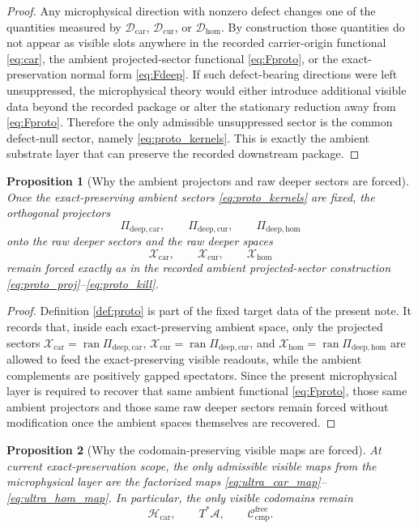 \documentclass[11pt]{article}
\newcommand{\Sub}{\mathcal A}
\newcommand{\CompFree}{\mathscr C_{\mathrm{cmp}}^{\mathrm{free}}}
\newcommand{\CarrierClass}{\mathscr H_{\mathrm{car}}}
\newcommand{\DeepTensorClass}{\mathscr X_{\mathrm{car}}}
\newcommand{\DeepRelabelClass}{\mathscr X_{\mathrm{cur}}}
\newcommand{\DeepFreeClass}{\mathscr X_{\mathrm{hom}}}
\newcommand{\ProtoCarProj}{\Pi_{\mathrm{deep,car}}}
\newcommand{\ProtoCurProj}{\Pi_{\mathrm{deep,cur}}}
\newcommand{\ProtoHomProj}{\Pi_{\mathrm{deep,hom}}}
\newcommand{\TensorDefect}{\mathcal D_{\mathrm{car}}}
\newcommand{\CurDefect}{\mathcal D_{\mathrm{cur}}}
\newcommand{\HomDefect}{\mathcal D_{\mathrm{hom}}}
\newtheorem{proposition}{Proposition}
\begin{document}
\begin{proof}
Any microphysical direction with nonzero defect changes one of the quantities measured by \(\TensorDefect\), \(\CurDefect\), or \(\HomDefect\). By construction those quantities do not appear as visible slots anywhere in the recorded carrier-origin functional \eqref{eq:car}, the ambient projected-sector functional \eqref{eq:Fproto}, or the exact-preservation normal form \eqref{eq:Fdeep}. If such defect-bearing directions were left unsuppressed, the microphysical theory would either introduce additional visible data beyond the recorded package or alter the stationary reduction away from \eqref{eq:Fproto}. Therefore the only admissible unsuppressed sector is the common defect-null sector, namely \eqref{eq:proto_kernels}. This is exactly the ambient substrate layer that can preserve the recorded downstream package.
\end{proof}

\begin{proposition}[Why the ambient projectors and raw deeper sectors are forced]
\label{prop:ambient_raw}
Once the exact-preserving ambient sectors \eqref{eq:proto_kernels} are fixed, the orthogonal projectors
\[
\ProtoCarProj,\qquad
\ProtoCurProj,\qquad
\ProtoHomProj
\]
onto the raw deeper sectors and the raw deeper spaces
\[
\DeepTensorClass,\qquad
\DeepRelabelClass,\qquad
\DeepFreeClass
\]
remain forced exactly as in the recorded ambient projected-sector construction \eqref{eq:proto_proj}--\eqref{eq:proto_kill}.
\end{proposition}

\begin{proof}
Definition \ref{def:proto} is part of the fixed target data of the present note. It records that, inside each exact-preserving ambient space, only the projected sectors \(\DeepTensorClass=\operatorname{ran}\ProtoCarProj\), \(\DeepRelabelClass=\operatorname{ran}\ProtoCurProj\), and \(\DeepFreeClass=\operatorname{ran}\ProtoHomProj\) are allowed to feed the exact-preserving visible readouts, while the ambient complements are positively gapped spectators. Since the present microphysical layer is required to recover that same ambient functional \eqref{eq:Fproto}, those same ambient projectors and those same raw deeper sectors remain forced without modification once the ambient spaces themselves are recovered.
\end{proof}

\begin{proposition}[Why the codomain-preserving visible maps are forced]
\label{prop:micro_codomains}
At current exact-preservation scope, the only admissible visible maps from the microphysical layer are the factorized maps \eqref{eq:ultra_car_map}--\eqref{eq:ultra_hom_map}. In particular, the only visible codomains remain
\[
\CarrierClass,\qquad
T^*\Sub,\qquad
\CompFree.
\]
\end{proposition}
\end{document}
